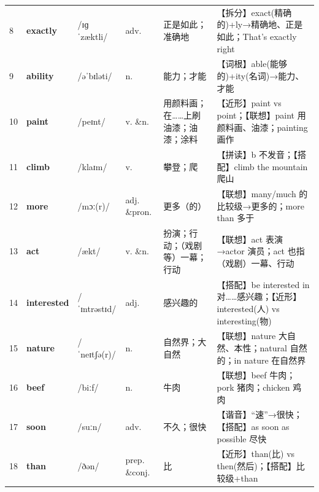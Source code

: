 \documentclass[UTF8,a4paper,11pt,oneside]{ctexbook}
\newcommand{\cellword}[1]{{\bfseries\textcolor{wordcol}{#1}}}
\newcommand{\cellipa}[1]{{\footnotesize\textcolor{ipacol}{#1}}}
\newcommand{\cellpos}[1]{\textcolor{poscol}{#1}}
\newcommand{\cellno}[1]{\textcolor{volcolor!75!black}{#1}}
\begin{document}
{\begin{longtable}{@{}C{0.045\textwidth}L{0.155\textwidth}L{0.175\textwidth}C{0.070\textwidth}L{0.180\textwidth}L{0.282\textwidth}@{}}
\cellno{8} & \cellword{exactly} & \cellipa{/ɪɡˈzæktli/} & \cellpos{adv.} & 正是如此；准确地 & \textcolor{tagSplit}{【拆分】}exact(精确的)+ly→\allowbreak{}精确地、正是如此；That's exactly right \\
 \cellno{9} & \cellword{ability} & \cellipa{/əˈbɪləti/} & \cellpos{n.} & 能力；才能 & \textcolor{tagRoot}{【词根】}able(能够的)+ity(名词)→\allowbreak{}能力、才能 \\
\cellno{10} & \cellword{paint} & \cellipa{/peɪnt/} & \cellpos{v. \&n.} & 用颜料画；在……上刷油漆；油漆；涂料 & \textcolor{tagNear}{【近形】}paint vs point；\textcolor{tagAssoc}{【联想】}paint 用颜料画、油漆；painting 画作 \\
 \cellno{11} & \cellword{climb} & \cellipa{/klaɪm/} & \cellpos{v.} & 攀登；爬 & \textcolor{tagSpell}{【拼读】}b 不发音；\textcolor{tagColloc}{【搭配】}climb the mountain 爬山 \\
\cellno{12} & \cellword{more} & \cellipa{/mɔː(r)/} & \cellpos{adj. \&pron.} & 更多（的） & \textcolor{tagAssoc}{【联想】}many/much 的比较级→\allowbreak{}更多的；more than 多于 \\
 \cellno{13} & \cellword{act} & \cellipa{/ækt/} & \cellpos{v. \&n.} & 扮演；行动；（戏剧等）一幕；行动 & \textcolor{tagAssoc}{【联想】}act 表演→\allowbreak{}actor 演员；act 也指（戏剧）一幕、行动 \\
\cellno{14} & \cellword{interested} & \cellipa{/ˈɪntrəstɪd/} & \cellpos{adj.} & 感兴趣的 & \textcolor{tagColloc}{【搭配】}be interested in 对……感兴趣；\textcolor{tagNear}{【近形】}interested(人) vs interesting(物) \\
 \cellno{15} & \cellword{nature} & \cellipa{/ˈneɪtʃə(r)/} & \cellpos{n.} & 自然界；大自然 & \textcolor{tagAssoc}{【联想】}nature 大自然、本性；natural 自然的；in nature 在自然界 \\
\cellno{16} & \cellword{beef} & \cellipa{/biːf/} & \cellpos{n.} & 牛肉 & \textcolor{tagAssoc}{【联想】}beef 牛肉；pork 猪肉；chicken 鸡肉 \\
 \cellno{17} & \cellword{soon} & \cellipa{/suːn/} & \cellpos{adv.} & 不久；很快 & \textcolor{tagSound}{【谐音】}“速”→\allowbreak{}很快；\textcolor{tagColloc}{【搭配】}as soon as possible 尽快 \\
\cellno{18} & \cellword{than} & \cellipa{/ðən/} & \cellpos{prep. \&conj.} & 比 & \textcolor{tagNear}{【近形】}than(比) vs then(然后)；\textcolor{tagColloc}{【搭配】}比较级+than \\

\end{longtable}}
\end{document}
